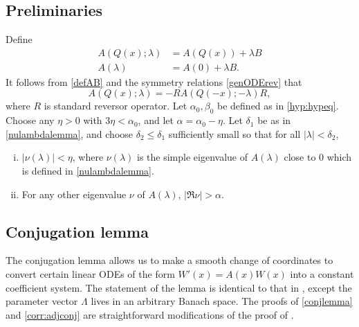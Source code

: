 \documentclass[10pt,reqno]{amsart}
\theoremstyle{plain}
\theoremstyle{definition}
\theoremstyle{remark}
\numberwithin{theorem}{section}
\numberwithin{equation}{section}
\begin{document}
\subsection{Preliminaries}

Define
\begin{equation}
\begin{aligned}
A(Q(x); \lambda) &= A(Q(x)) + \lambda B \\
A(\lambda) &= A(0) + \lambda B.
\end{aligned}
\end{equation}
It follows from \cref{defAB} and the symmetry relations \cref{genODErev} that 
\begin{equation}\label{AQsymmetry}
A(Q(x); \lambda) = -R A(Q(-x); -\lambda)R,
\end{equation}
where $R$ is standard reversor operator. Let $\alpha_0, \beta_0$ be defined as in \cref{hyp:hypeq}. Choose any $\eta > 0$ with $3 \eta < \alpha_0$, and let $\alpha = \alpha_0 - \eta$. Let $\delta_1$ be as in \cref{nulambdalemma}, and choose $\delta_2 \leq \delta_1$ sufficiently small so that for all $|\lambda| < \delta_2$,
\begin{enumerate}[(i)]
\item $|\nu(\lambda)| < \eta$, where $\nu(\lambda)$ is the simple eigenvalue of $A(\lambda)$ close to 0 which is defined in \cref{nulambdalemma}.
\item For any other eigenvalue $\nu$ of $A(\lambda)$, $|\Re \nu| > \alpha$.
\end{enumerate} 

\subsection{Conjugation lemma}

The conjugation lemma allows us to make a smooth change of coordinates to convert certain linear ODEs of the form $W'(x) = A(x) W(x)$ into a constant coefficient system. The statement of the lemma is identical to that in \cite{Zumbrun2009}, except the parameter vector $\Lambda$ lives in an arbitrary Banach space. The proofs of \cref{conjlemma} and \cref{corr:adjconj} are straightforward modifications of the proof of \cite[Corollary 2.3]{Zumbrun2009}.
\end{document}
